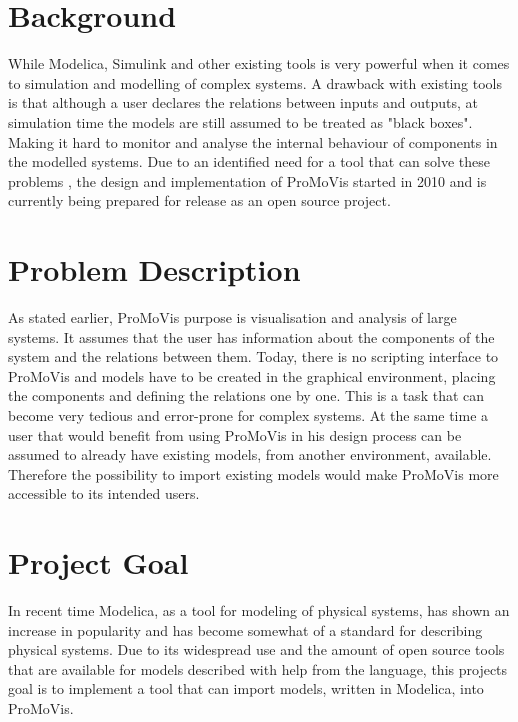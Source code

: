 \section{Background}
While Modelica, Simulink and other existing tools is very powerful when it comes to simulation and modelling of complex systems. A drawback with existing tools is that although a user declares the relations between inputs and outputs, at simulation time the models are still assumed to be treated as "black boxes". Making it hard to monitor and analyse the internal behaviour of components in the modelled systems. Due to an identified need for a tool that can solve these problems \cite{ProMoVisPaper}\nocite{*}, the design and implementation of ProMoVis started in 2010 and is currently being prepared for release as an open source project.
\section{Problem Description}
As stated earlier, ProMoVis purpose is visualisation and analysis of large systems. It assumes that the user has information about the components of the system and the relations between them. Today, there is no scripting interface to ProMoVis and models have to be created in the graphical environment, placing the components and defining the relations one by one. This is a task that can become very tedious and error-prone for complex systems. At the same time a user that would benefit from using ProMoVis in his design process can be assumed to already have existing models, from another environment, available. Therefore the possibility to import existing models would make ProMoVis more accessible to its intended users.
\section{Project Goal}
In recent time Modelica, as a tool for modeling of physical systems, has shown an increase in popularity and has become somewhat of a standard for describing physical systems. Due to its widespread use and the amount of open source tools that are available for models described with help from the language, this projects goal is to implement a tool that can import models, written in Modelica, into ProMoVis.





